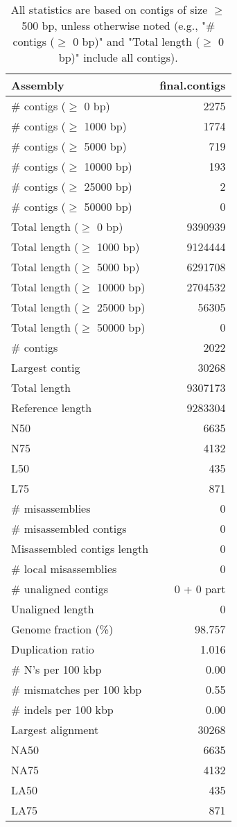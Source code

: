 \documentclass[12pt,a4paper]{article}
\begin{document}
\begin{table}[ht]
\begin{center}
\caption{All statistics are based on contigs of size $\geq$ 500 bp, unless otherwise noted (e.g., "\# contigs ($\geq$ 0 bp)" and "Total length ($\geq$ 0 bp)" include all contigs).}
\begin{tabular}{|l*{1}{|r}|}
\hline
Assembly & final.contigs \\ \hline
\# contigs ($\geq$ 0 bp) & 2275 \\ \hline
\# contigs ($\geq$ 1000 bp) & 1774 \\ \hline
\# contigs ($\geq$ 5000 bp) & 719 \\ \hline
\# contigs ($\geq$ 10000 bp) & 193 \\ \hline
\# contigs ($\geq$ 25000 bp) & 2 \\ \hline
\# contigs ($\geq$ 50000 bp) & 0 \\ \hline
Total length ($\geq$ 0 bp) & 9390939 \\ \hline
Total length ($\geq$ 1000 bp) & 9124444 \\ \hline
Total length ($\geq$ 5000 bp) & 6291708 \\ \hline
Total length ($\geq$ 10000 bp) & 2704532 \\ \hline
Total length ($\geq$ 25000 bp) & 56305 \\ \hline
Total length ($\geq$ 50000 bp) & 0 \\ \hline
\# contigs & 2022 \\ \hline
Largest contig & 30268 \\ \hline
Total length & 9307173 \\ \hline
Reference length & 9283304 \\ \hline
N50 & 6635 \\ \hline
N75 & 4132 \\ \hline
L50 & 435 \\ \hline
L75 & 871 \\ \hline
\# misassemblies & 0 \\ \hline
\# misassembled contigs & 0 \\ \hline
Misassembled contigs length & 0 \\ \hline
\# local misassemblies & 0 \\ \hline
\# unaligned contigs & 0 + 0 part \\ \hline
Unaligned length & 0 \\ \hline
Genome fraction (\%) & 98.757 \\ \hline
Duplication ratio & 1.016 \\ \hline
\# N's per 100 kbp & 0.00 \\ \hline
\# mismatches per 100 kbp & 0.55 \\ \hline
\# indels per 100 kbp & 0.00 \\ \hline
Largest alignment & 30268 \\ \hline
NA50 & 6635 \\ \hline
NA75 & 4132 \\ \hline
LA50 & 435 \\ \hline
LA75 & 871 \\ \hline
\end{tabular}
\end{center}
\end{table}
\end{document}
